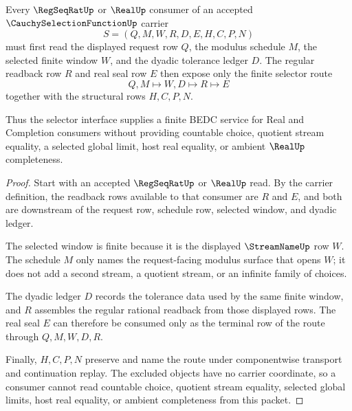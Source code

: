 \begin{theorem}
\label{thm:cauchy-selection-function-regular-readback}
Every $\RegSeqRatUp$ or $\RealUp$ consumer of an accepted $\CauchySelectionFunctionUp$ carrier
$$
S=(Q,M,W,R,D,E,H,C,P,N)
$$
must first read the displayed request row $Q$, the modulus schedule $M$, the selected finite window $W$, and the dyadic tolerance ledger $D$. The regular readback row $R$ and real seal row $E$ then expose only the finite selector route
$$
Q,M \longmapsto W,D \longmapsto R \longmapsto E
$$
together with the structural rows $H,C,P,N$.

Thus the selector interface supplies a finite BEDC service for Real and Completion consumers without providing countable choice, quotient stream equality, a selected global limit, host real equality, or ambient $\RealUp$ completeness.
\end{theorem}
\begin{proof}
Start with an accepted $\RegSeqRatUp$ or $\RealUp$ read. By the carrier definition, the readback rows available to that consumer are $R$ and $E$, and both are downstream of the request row, schedule row, selected window, and dyadic ledger.

The selected window is finite because it is the displayed $\StreamNameUp$ row $W$. The schedule $M$ only names the request-facing modulus surface that opens $W$; it does not add a second stream, a quotient stream, or an infinite family of choices.

The dyadic ledger $D$ records the tolerance data used by the same finite window, and $R$ assembles the regular rational readback from those displayed rows. The real seal $E$ can therefore be consumed only as the terminal row of the route through $Q,M,W,D,R$.

Finally, $H,C,P,N$ preserve and name the route under componentwise transport and continuation replay. The excluded objects have no carrier coordinate, so a consumer cannot read countable choice, quotient stream equality, selected global limits, host real equality, or ambient completeness from this packet.
\end{proof}


